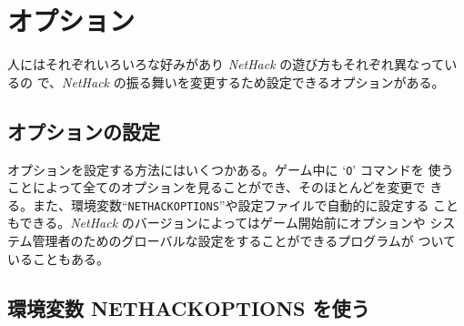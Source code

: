 \section{オプション}

人にはそれぞれいろいろな好みがあり {\it NetHack\/} の遊び方もそれぞれ異なっているの
で、{\it NetHack\/} の振る舞いを変更するため設定できるオプションがある。

\subsection*{オプションの設定}

オプションを設定する方法にはいくつかある。ゲーム中に `{\tt O}' コマンドを
使うことによって全てのオプションを見ることができ、そのほとんどを変更で
きる。また、環境変数``{\tt NETHACKOPTIONS}''や設定ファイルで自動的に設定する
こともできる。{\it NetHack\/} のバージョンによってはゲーム開始前にオプションや
システム管理者のためのグローバルな設定をすることができるプログラムが
ついていることもある。

\subsection*{環境変数 NETHACKOPTIONS を使う}

